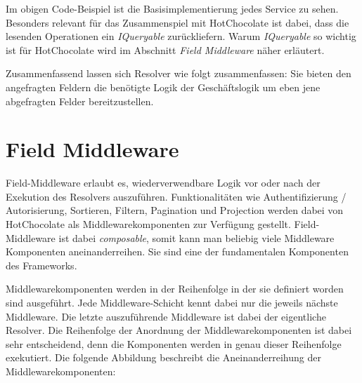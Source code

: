 Im obigen Code-Beispiel ist die Basisimplementierung jedes Service zu sehen.
Besonders relevant für das Zusammenspiel mit HotChocolate ist dabei, dass die lesenden Operationen ein \textit{IQueryable} zurückliefern.
Warum \textit{IQueryable} so wichtig ist für HotChocolate wird im Abschnitt \textit{Field Middleware} näher erläutert.
\newline

Zusammenfassend lassen sich Resolver wie folgt zusammenfassen: Sie bieten den angefragten Feldern die benötigte Logik der Geschäftslogik um eben jene abgefragten Felder bereitzustellen.

\section{Field Middleware}
Field-Middleware erlaubt es, wiederverwendbare Logik vor oder nach der Exekution des Resolvers auszuführen.
Funktionalitäten wie Authentifizierung / Autorisierung, Sortieren, Filtern, Pagination und Projection werden dabei von HotChocolate als Middlewarekomponenten zur Verfügung gestellt. 
Field-Middleware ist dabei \textit{composable}, somit kann man beliebig viele Middleware Komponenten aneinanderreihen.
Sie sind eine der fundamentalen Komponenten des Frameworks.


Middlewarekomponenten werden in der Reihenfolge in der sie definiert worden sind ausgeführt.
Jede Middleware-Schicht kennt dabei nur die jeweils nächste Middleware.
Die letzte auszuführende Middleware ist dabei der eigentliche Resolver.
Die Reihenfolge der Anordnung der Middlewarekomponenten ist dabei sehr entscheidend, denn die Komponenten werden in genau dieser Reihenfolge exekutiert.
Die folgende Abbildung beschreibt die Aneinanderreihung der Middlewarekomponenten:


